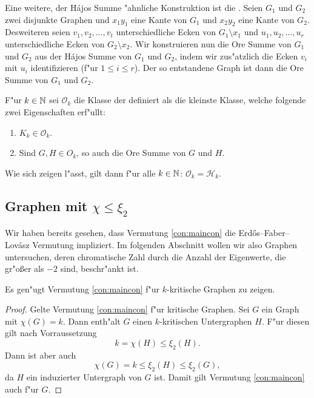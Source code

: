   Eine weitere, der H\'ajos Summe "ahnliche Konstruktion ist die  \cite{Ore67}. Seien $G_1$ und $G_2$ zwei disjunkte Graphen und $x_1y_1$ eine Kante von $G_1$ und $x_2y_2$ eine Kante von $G_2$. Desweiteren seien $v_1,v_2,\dots,v_t$ unterschiedliche Ecken von $G_1\setminus x_1$ und $u_1,u_2,\dots,u_r$ unterschiedliche Ecken von $G_2\setminus x_2$. Wir konstruieren nun die Ore Summe von $G_1$ und $G_2$ aus der H\'ajos Summe von $G_1$ und $G_2$, indem
  wir zus"atzlich die Ecken $v_i$ mit $u_i$ identifizieren (f"ur $1\leq i \leq r$). Der so entstandene Graph ist dann die Ore Summe von $G_1$ und $G_2$. 

  F"ur $k\in {\mathbb{N}}$ sei $\mathcal{O}_k$ die Klasse der  definiert als die kleinste Klasse, welche folgende zwei Eigenschaften erf"ullt:
  \begin{enumerate}
    \item $K_k\in \mathcal{O}_k$.
    \item Sind $G,H\in O_k$, so auch die Ore Summe von $G$ und $H$.
  \end{enumerate}

  Wie sich zeigen l"asst, gilt dann f"ur alle $k\in{\mathbb{N}}$: $\mathcal{O}_k = \mathcal{H}_k$.

  \subsection{Graphen mit $\chi \leq \xi_{2}$}

  Wir haben bereits gesehen, dass Vermutung \ref{con:maincon} die Erd\H{o}s--Faber--Lov\'asz Vermutung impliziert. Im folgenden Abschnitt wollen wir also Graphen untersuchen, deren chromatische Zahl durch die Anzahl der Eigenwerte, die gr"o{\ss}er als $-2$ sind, beschr"ankt ist.
  \begin{remark}
    Es gen"ugt Vermutung \ref{con:maincon} f"ur $k$-kritische Graphen zu zeigen. 
  \end{remark}

  \begin{proof}
    Gelte Vermutung \ref{con:maincon} f"ur kritische Graphen.
    Sei $G$ ein Graph mit $\chi(G) = k$. Dann enth"alt $G$ einen $k$-kritischen Untergraphen $H$. F"ur diesen gilt nach Vorraussetzung $$k= \chi(H) \leq \xi_{2}(H).$$ Dann ist aber auch $$ \chi(G) = k \leq \xi_{2}(H) \leq \xi_{2}(G) ,$$ da $H$ ein induzierter Untergraph von $G$ ist.  Damit gilt Vermutung \ref{con:maincon} auch f"ur $G$.
  \end{proof}

